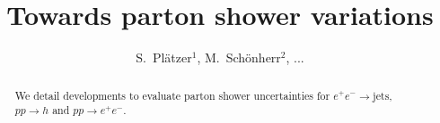 \documentclass[11pt]{cernrep}
\begin{document}
\title{Towards parton shower variations}

\author{
  S.\ Pl\"atzer$^1$,
  M.\ Sch\"onherr$^2$,
  ...
}

\maketitle

\begin{abstract}
  We detail developments to evaluate parton shower uncertainties 
  for $e^+e^-\to\text{jets}$, $pp\to h$ and $pp\to e^+e^-$.
\end{abstract}






\end{document}
